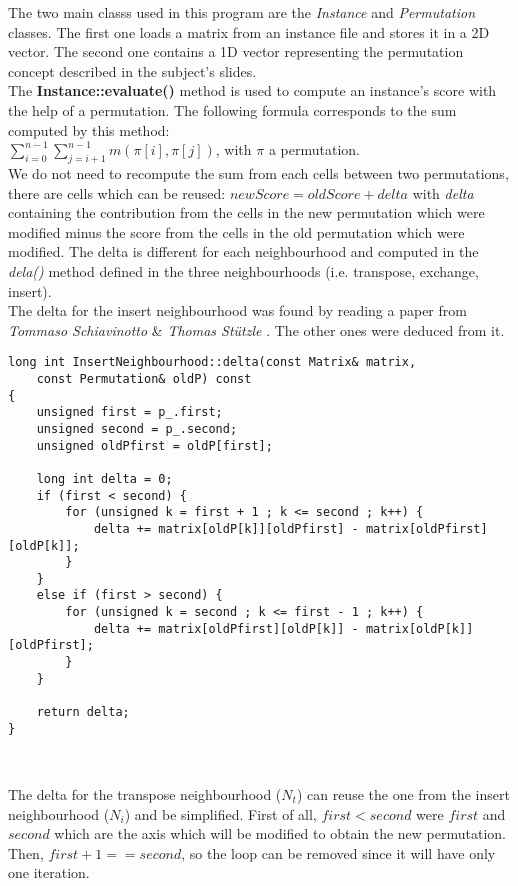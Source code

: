 The two main classs used in this program are the \emph{Instance} and
\emph{Permutation} classes. The first one loads a matrix from an instance file
and stores it in a 2D vector. The second one contains a 1D vector representing
the permutation concept described in the subject's slides.\\

The \textbf{Instance::evaluate()} method is used to compute an instance's score
with the help of a permutation. The following formula corresponds to the sum
computed by this method:\\
$\sum_{i=0}^{n-1} \sum_{j=i+1}^{n-1} m(\pi[i], \pi[j])$, with $\pi$ a
permutation.\\

We do not need to recompute the sum from each cells between two permutations,
there are cells which can be reused: $newScore = oldScore + delta$
with \emph{delta} containing the contribution from the cells in the new
permutation which were modified minus the score from the cells in the old
permutation which were modified. The delta is different for each neighbourhood
and computed in the \emph{dela()} method defined in the three neighbourhoods
(i.e. transpose, exchange, insert).\\

The delta for the insert neighbourhood was found by reading a paper from
\emph{Tommaso Schiavinotto} \& \emph{Thomas Stützle} \cite{cite:lopPaper}.
The other ones were deduced from it.\\

\begin{lstlisting}
long int InsertNeighbourhood::delta(const Matrix& matrix,
    const Permutation& oldP) const
{
    unsigned first = p_.first;
    unsigned second = p_.second;
    unsigned oldPfirst = oldP[first];
    
    long int delta = 0;
    if (first < second) {
        for (unsigned k = first + 1 ; k <= second ; k++) {
            delta += matrix[oldP[k]][oldPfirst] - matrix[oldPfirst][oldP[k]];
        }
    }
    else if (first > second) {
        for (unsigned k = second ; k <= first - 1 ; k++) {
            delta += matrix[oldPfirst][oldP[k]] - matrix[oldP[k]][oldPfirst];
        }
    }
    
    return delta;
}
\end{lstlisting}
\

The delta for the transpose neighbourhood ($N_t$) can reuse the one from the
insert neighbourhood ($N_i$) and be simplified. First of all, $first < second$
were $first$ and $second$ which are the axis which will be modified to obtain
the new permutation. Then, $first + 1 == second$, so the loop can be removed
since it will have only one iteration.\\

